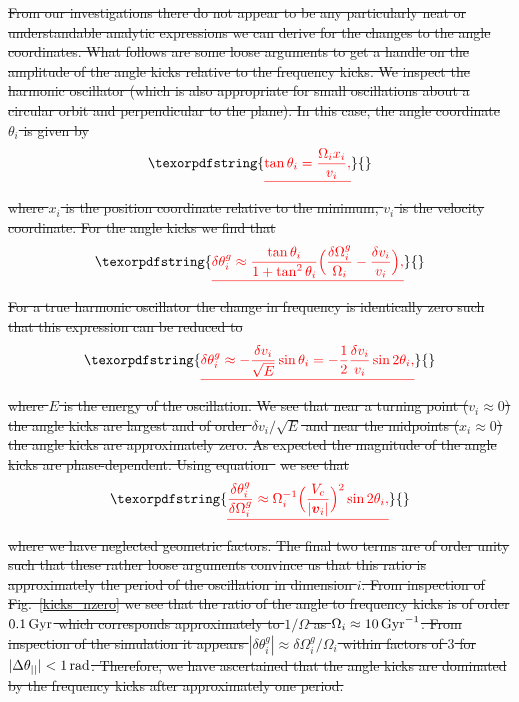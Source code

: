 \documentclass[useAMS,usenatbib,fleqn,a4paper]{mn2e}
\def\rad{\,\rm rad}
\def\Gyr{\,{\rm Gyr}}
\newcommand{\bs}[1]{\bmath{#1}}
\providecommand{\DIFdeltex}[1]{{\protect\color{red}\sout{#1}}}                      %
\providecommand{\DIFdelbegin}{} %
\providecommand{\DIFdel}[1]{\texorpdfstring{\DIFdeltex{#1}}{}} %
\begin{document}
\DIFdelbegin \DIFdel{From our investigations there do not appear to be any particularly neat or understandable analytic expressions we can derive for the changes to the angle coordinates. What follows are some loose arguments to get a handle on the amplitude of the angle kicks relative to the frequency kicks. We inspect the harmonic oscillator (which is also appropriate for small oscillations about a circular orbit and perpendicular to the plane). In this case, the angle coordinate $\theta_i$ is given by
}\begin{displaymath}
\DIFdel{\tan\theta_i = \frac{\Omega_i x_i}{v_i},
}\end{displaymath}
\DIFdel{where $x_i$ is the position coordinate relative to the minimum, $v_i$ is the velocity coordinate. For the angle kicks we find that
}\begin{displaymath}
\DIFdel{\delta\theta^g_i\approx \frac{\tan\theta_i}{1+\tan^2\theta_i}\Big(\frac{\delta\Omega^g_i}{\Omega_i}-\frac{\delta v_i}{v_i}\Big),
}\end{displaymath}
\DIFdel{For a true harmonic oscillator the change in frequency is identically zero such that this expression can be reduced to
}\begin{displaymath}
\DIFdel{\delta\theta^g_i\approx -\frac{\delta v_i}{\sqrt{E}}\sin\theta_i = -\frac{1}{2}\frac{\delta v_i}{v_i}\sin 2\theta_i,
}\end{displaymath}
\DIFdel{where $E$ is the energy of the oscillation. We see that near a turning point ($v_i\approx0$) the angle kicks are largest and of order $\delta v_i/\sqrt{E}$ and near the midpoints ($x_i\approx0$) the angle kicks are approximately zero. As expected the magnitude of the angle kicks are phase-dependent. Using equation~}%
\DIFdel{we see that
}\begin{displaymath}
\DIFdel{\frac{\delta\theta_i^g}{\delta\Omega_i^g}\approx\Omega_i^{-1}\Big(\frac{V_c}{|\bs{v}_i|}\Big)^2\sin 2\theta_i,
}\end{displaymath}
\DIFdel{where we have neglected geometric factors. The final two terms are of order unity such that these rather loose arguments convince us that this ratio is approximately the period of the oscillation in dimension $i$. From inspection of Fig.~\ref{kicks_nzero} we see that the ratio of the angle to frequency kicks is of order $0.1\Gyr$ which corresponds approximately to $1/\Omega$ as $\Omega_i\approx10\Gyr^{-1}$. From inspection of the simulation it appears $|\delta\theta^g_i|\approx\delta\Omega^g_i/\Omega_i$ within factors of $3$ for $|\Delta\theta_{||}|<1\rad$. Therefore, we have ascertained that the angle kicks are dominated by the frequency kicks after approximately one period.
}%
\end{document}
